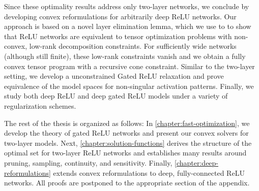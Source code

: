 Since these optimality results address only two-layer networks, we conclude by
developing convex reformulations for arbitrarily deep ReLU networks.
Our approach is based on a novel layer elimination lemma, which we use to
to show that ReLU networks are equivalent to tensor optimization problems with
non-convex, low-rank decomposition constraints.
For sufficiently wide networks (although still finite), these low-rank
constraints vanish and we obtain a fully convex tensor program with a
recursive cone constraint.
Similar to the two-layer setting, we develop a unconstrained Gated ReLU
relaxation and prove equivalence of the model spaces for non-singular
activation patterns.
Finally, we study both deep ReLU and deep gated ReLU models under a variety
of regularization schemes.

The rest of the thesis is organized as follows:
In \cref{chapter:fast-optimization}, we develop the theory of gated ReLU
networks and present our convex solvers for two-layer models.
Next, \cref{chapter:solution-functions} derives the structure of the optimal
set for two-layer ReLU networks and establishes many results around pruning,
sampling, continuity, and sensitivity.
Finally, \cref{chapter:deep-reformulations} extends convex reformulations
to deep, fully-connected ReLU networks.
All proofs are postponed to the appropriate section of the appendix.

